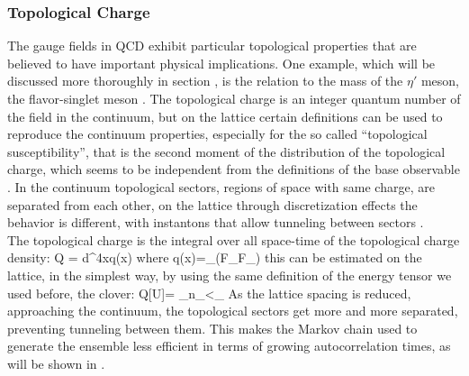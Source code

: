 \subsubsection{Topological Charge}
The gauge fields in QCD exhibit particular topological properties that are believed to have important physical implications. One example, which will be discussed more thoroughly in section \LINK, is the relation to the mass of the $\eta'$ meson, the flavor-singlet meson \CIT. The topological charge is an integer quantum number of the field in the continuum, but on the lattice certain definitions can be used to reproduce the continuum properties, especially for the so called ``topological susceptibility'', that is the second moment of the distribution of the topological charge, which seems to be independent from the definitions of the base observable \CIT. In the continuum topological sectors, regions of space with same charge, are separated from each other, on the lattice through discretization effects the behavior is different, with instantons that allow tunneling between sectors \CIT.\\ 
The topological charge is the integral over all space-time of the topological charge density:
\beq
    Q = \int d^4xq(x)
\eeq
where
\beq 
    q(x)=\epsilon_{\mu\nu\rho\sigma}\Tr(F_{\mu\nu}F_{\mu\nu}) 
\eeq
this can be estimated on the lattice, in the simplest way, by using the same definition of the energy tensor we used before, the clover:
\beq
    Q[U]= \sum_{n\in\Lambda}\sum_{\mu<\nu}\epsilon_{\mu\nu\rho\sigma}\Tr[G_{\mu\nu}(n)G_{\mu\nu}(n)]
\eeq
As the lattice spacing is reduced, approaching the continuum, the topological sectors get more and more separated, preventing tunneling between them. This makes the Markov chain used to generate the ensemble less efficient in terms of growing autocorrelation times, as will be shown in \LINK.
